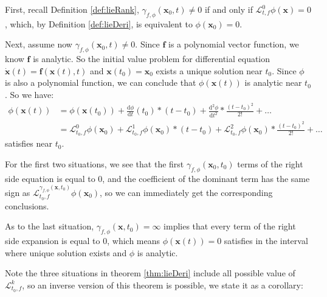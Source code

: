 \documentclass{article}
\begin{document}
\begin{Proof}
First, recall Definition \ref{def:lieRank}, $\gamma_{f, \phi}(\boldsymbol{x}_0, t) \neq 0$ if and only if $\mathcal{L}_{t, f}^0 \phi (\boldsymbol{x}) = 0$, which, by Definition \ref{def:lieDeri}, is equivalent to $\phi(\boldsymbol{x}_0) = 0$. 

Next, assume now $\gamma_{f, \phi}(\boldsymbol{x}_0, t) \neq 0$. Since $\boldsymbol{f}$ is a polynomial vector function, we know $\boldsymbol{f}$ is analytic. So the initial value problem for differential equation $\dot{\boldsymbol{x}}(t) = \boldsymbol{f}(\boldsymbol{x}(t),t)$ and $\boldsymbol{x}(t_0) = \boldsymbol{x}_0$ exists a unique solution near $t_0$\cite{tenenbaum1963ordinary}. Since $\phi$ is also a polynomial function, we can conclude that $\phi(\boldsymbol{x}(t))$ is analytic near $t_0$. So we have: 
	\begin{equation*}
		\begin{split}
		\phi(\boldsymbol{x}(t)) &= \phi(\boldsymbol{x}(t_0)) + \frac{\mathrm{d} \phi}{\mathrm{d}t}(t_0) * (t-t_0) + \frac{\mathrm{d}^2 \phi}{\mathrm{d}t^2} * \frac{(t-t_0)^2}{2!} + \dots \\
							&= {\mathcal{L}_{t_0, f}^0 \phi(\boldsymbol{x}_0)} + \mathcal{L}_{t_0, f}^1 \phi(\boldsymbol{x}_0) * (t-t_0) + \mathcal{L}_{t_0, f}^2 \phi(\boldsymbol{x}_0) * \frac{(t-t_0)^2}{2!} + \dots
		\end{split}
	\end{equation*}
satisfies near $t_0$.

For the first two situations, we see that the first $\gamma_{f, \phi}(\boldsymbol{x}_0, t_0)$ terms of the right side equation is equal to 0, and the coefficient of the dominant term has the same sign as $\mathcal{L}_{t_0, f}^{\gamma_{f, \phi}(\boldsymbol{x}, t_0)} \phi (\boldsymbol{x}_0)$, so we can immediately get the corresponding conclusions. 

As to the last situation, $\gamma_{f, \phi}(\boldsymbol{x}, t_0) = \infty$ implies that every term of the right side expansion is equal to 0, which means $\phi (\boldsymbol{x}(t)) =0$ satisfies in the interval where unique solution exists and $\phi$ is analytic.
\end{Proof}

Note the three situations in theorem \ref{thm:lieDeri} include all possible value of $\mathcal{L}_{t_0, f}^{k}$, so an inverse version of this theorem is possible, we state it as a corollary: 
\end{document}
